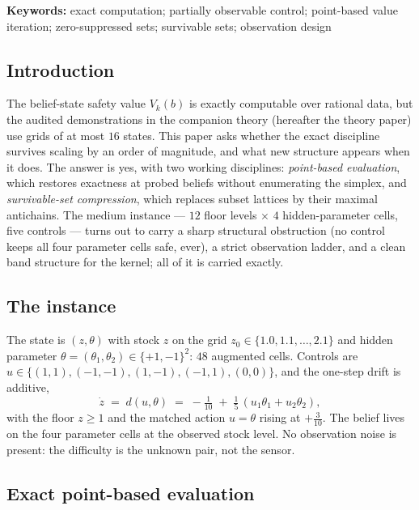 \documentclass[10pt,twocolumn]{article}
\theoremstyle{plain}
\theoremstyle{definition}
\theoremstyle{remark}
\begin{document}
\textbf{Keywords:} exact computation; partially observable control;
point-based value iteration; zero-suppressed sets; survivable sets;
observation design

\subsection{Introduction}\label{introduction}

The belief-state safety value \(V_{k}(b)\) is exactly computable over
rational data, but the audited demonstrations in the companion theory
(hereafter the theory paper) use grids of at most \(16\) states. This
paper asks whether the exact discipline survives scaling by an order of
magnitude, and what new structure appears when it does. The answer is
yes, with two working disciplines: \emph{point-based evaluation}, which
restores exactness at probed beliefs without enumerating the simplex,
and \emph{survivable-set compression}, which replaces subset lattices
by their maximal antichains. The medium instance --- \(12\) floor
levels \(\times\) \(4\) hidden-parameter cells, five controls --- turns
out to carry a sharp structural obstruction (no control keeps all four
parameter cells safe, ever), a strict observation ladder, and a clean
band structure for the kernel; all of it is carried exactly.

\subsection{The instance}\label{instance}

The state is \((z, \theta)\) with stock \(z\) on the grid
\(z_{0} \in \{1.0, 1.1, \dots, 2.1\}\) and hidden parameter
\(\theta = (\theta_{1}, \theta_{2}) \in \{+1, -1\}^{2}\): \(48\)
augmented cells. Controls are \(u \in \{(1,1), (-1,-1), (1,-1),
(-1,1), (0,0)\}\), and the one-step drift is additive,
\[
\dot z \;=\; d(u, \theta) \;=\; -\tfrac{1}{10}
\;+\; \tfrac{1}{5}\,(u_{1}\theta_{1} + u_{2}\theta_{2}),
\]
with the floor \(z \ge 1\) and the matched action \(u = \theta\)
rising at \(+\tfrac{3}{10}\). The belief lives on the four parameter
cells at the observed stock level. No observation noise is present:
the difficulty is the unknown pair, not the sensor.

\subsection{Exact point-based evaluation}\label{pbvi}
\end{document}
